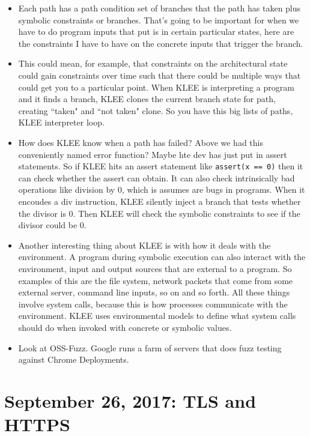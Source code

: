 \documentclass[12pt]{article}
\theoremstyle{definition}
\begin{document}
\begin{itemize}
    \item Each path has a path condition set of branches that the path has taken plus symbolic constraints or branches. That's going to be important for when we have to do program inputs that put is in certain particular states, here are the constraints I have to have on the concrete inputs that trigger the branch.

    \item This could mean, for example, that constraints on the architectural state could gain constraints over time such that there could be multiple ways that could get you to a particular point. When KLEE is interpreting a program and it finds a branch, KLEE clones the current branch state for path, creating ``taken" and ``not taken" clone. So you have this big lists of paths, KLEE interpreter loop.

    \item How does KLEE know when a path has failed? Above we had this conveniently named error function? Maybe hte dev has just put in assert statements. So if KLEE hits an assert statement like \texttt{assert(x == 0)} then it can check whether the assert can obtain. It can also check intrinsically bad operations like division by 0, which is assumes are bugs in programs. When it encoudes a div instruction, KLEE silently inject a branch that tests whether the divisor is 0. Then KLEE will check the symbolic constraints to see if the divisor could be 0.

    \item Another interesting thing about KLEE is with how it deals with the environment. A program during symbolic execution can also interact with the environment, input and output sources that are external to a program. So examples of this are the file system, network packets that come from some external server, command line inputs, so on and so forth. All these things involve system calls, because this is how processes communicate with the environment. KLEE uses environmental models to define what system calls should do when invoked with concrete or symbolic values.

    \item Look at OSS-Fuzz. Google runs a farm of servers that does fuzz testing against Chrome Deployments.

\end{itemize}

\section{September 26, 2017: TLS and HTTPS}
\end{document}
